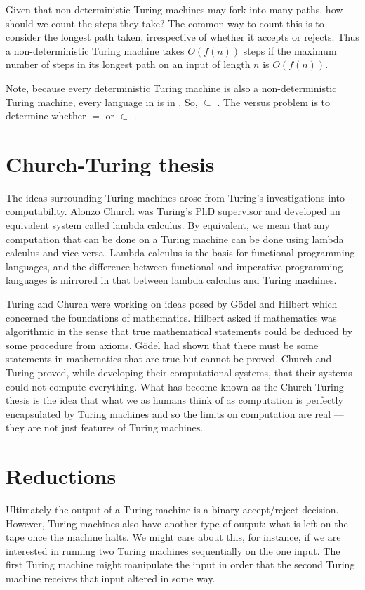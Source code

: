 \documentclass{iansnotes}
\begin{document}
  Given that non-deterministic Turing machines may fork into many paths, how should we count the steps they take?
  The common way to count this is to consider the longest path taken, irrespective of whether it accepts or rejects.
  Thus a non-deterministic Turing machine takes \(O(f(n))\) steps if the maximum number of steps in its longest path on an input of length \(n\) is \(O(f(n))\).

  Note, because every deterministic Turing machine is also a non-deterministic Turing machine, every language in  is in .
  So,  \( \subseteq \) .
  The  versus  problem is to determine whether  \( = \)  or  \( \subset \) .

\section{Church-Turing thesis}
  The ideas surrounding Turing machines arose from Turing's investigations into computability.
  Alonzo Church was Turing's PhD supervisor and developed an equivalent system called lambda calculus.
  By equivalent, we mean that any computation that can be done on a Turing machine can be done using lambda calculus and vice versa.
  Lambda calculus is the basis for functional programming languages, and the difference between functional and imperative programming languages is mirrored in that between lambda calculus and Turing machines.
  
  Turing and Church were working on ideas posed by G{\"o}del and Hilbert which concerned the foundations of mathematics.
  Hilbert asked if mathematics was algorithmic in the sense that true mathematical statements could be deduced by some procedure from axioms.
  G{\"o}del had shown that there must be some statements in mathematics that are true but cannot be proved.
  Church and Turing proved, while developing their computational systems, that their systems could not compute everything.
  What has become known as the Church-Turing thesis is the idea that what we as humans think of as computation is perfectly encapsulated by Turing machines and so the limits on computation are real --- they are not just features of Turing machines.

\section{Reductions}
  Ultimately the output of a Turing machine is a binary accept/reject decision.
  However, Turing machines also have another type of output: what is left on the tape once the machine halts.
  We might care about this, for instance, if we are interested in running two Turing machines sequentially on the one input.
  The first Turing machine might manipulate the input in order that the second Turing machine receives that input altered in some way.
\end{document}
